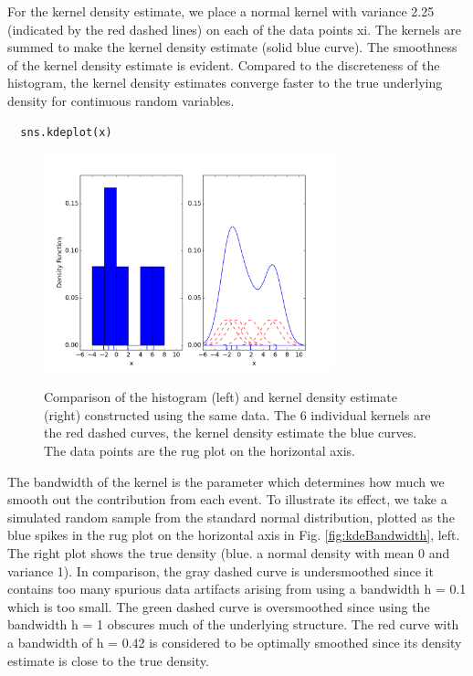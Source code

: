 For the kernel density estimate, we place a normal kernel with variance 2.25 (indicated by the red dashed lines) on each of the data points xi. The kernels are summed to make the kernel density estimate (solid blue curve). The smoothness of the kernel density estimate is evident. Compared to the discreteness of the histogram, the kernel density estimates converge faster to the true underlying density for continuous random variables.

\begin{lstlisting}
  sns.kdeplot(x)
\end{lstlisting}
\begin{figure}[H]
  \centering
  \includegraphics[width=0.75\textwidth]{../Images/KDEexplained.png}\\
  \caption{Comparison of the histogram (left) and kernel density estimate (right) constructed using the same data. The 6 individual kernels are the red dashed curves, the kernel density estimate the blue curves. The data points are the rug plot on the horizontal axis.}
\end{figure}


The bandwidth of the kernel is the parameter which determines how much we smooth out the contribution from each event. To illustrate its effect, we take a simulated random sample from the standard normal distribution, plotted as the blue spikes in the rug plot on the horizontal axis in Fig. \ref{fig:kdeBandwidth}, left. The right plot shows the true density (blue. a normal density with mean 0 and variance 1). In comparison, the gray dashed curve is undersmoothed since it contains too many spurious data artifacts arising from using a bandwidth h = 0.1 which is too small. The green dashed curve is oversmoothed since using the bandwidth h = 1 obscures much of the underlying structure. The red curve with a bandwidth of h = 0.42 is considered to be optimally smoothed since its density estimate is close to the true density.

